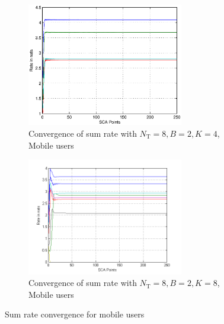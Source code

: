\documentclass[a4paper, 12pt,titlepage]{dithesis} %
\begin{document}
\begin{figure}
	\centering
	\begin{subfigure}[b]{0.75\textwidth}
		\centering
		\includegraphics[width=0.75\textwidth]{kktrc8142}
		\caption{Convergence of sum rate with $N_\mathrm{T} = 8, B = 2, K = 4$, Mobile users}
		\label{fig_1}
	\end{subfigure}
	\begin{subfigure}[b]{0.75\textwidth}
		\centering
		\includegraphics[width=0.75\textwidth]{kkte0rc8182}
		\caption{Convergence of sum rate with $N_\mathrm{T} = 8, B = 2, K = 8$, Mobile users}
		\label{fig-2}
	\end{subfigure}
	\caption{Sum rate convergence for mobile users}
	\label{figII}
\end{figure}
\end{document}
